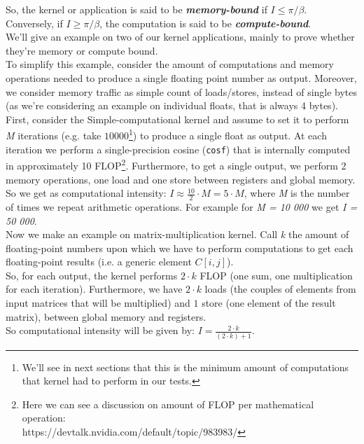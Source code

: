 	So, the kernel or application is said to be \textit{\textbf{memory-bound}} if \(I \leq \pi /\beta \).\\
	Conversely, if \( I\geq \pi /\beta \), the computation is said to be \textit{\textbf{compute-bound}}\cite{rooflinepaper, applyroofline}.\\
	We'll give an example on two of our kernel applications, mainly to prove whether they're memory or compute bound.\\
	To simplify this example, consider the amount of computations and memory operations needed to produce a single floating point number as output.
	Moreover, we consider memory traffic as simple count of loads/stores, instead of single bytes (as we're considering an example on individual floats, that is always 4 bytes).\\
	First, consider the Simple-computational kernel and assume to set it to perform \textit{M} iterations (e.g. take \(10000\)\footnote{We'll see in next sections that this is the minimum amount of computations that kernel had to perform in our tests.}) to produce a single float as output. At each iteration we perform a single-precision cosine (\texttt{cosf}) that is internally computed in approximately 10 FLOP\footnote{Here we can see a discussion on amount of FLOP per mathematical operation:\\ https://devtalk.nvidia.com/default/topic/983983/}. Furthermore, to get a single output, we perform 2 memory operations, one load and one store between registers and global memory.\\
	So we get as computational intensity: \(I \approx \frac{10}{2} \cdot M = 5 \cdot M \), where \textit{M} is the number of times we repeat arithmetic operations. For example for \textit{M = 10 000} we get \textit{I = 50 000}.\\
	
	Now we make an example on matrix-multiplication kernel.
	Call \textit{k} the amount of floating-point numbers upon which we have to perform computations to get each floating-point results (i.e. a generic element \(C[i, j]\)).\\
	So, for each output, the kernel performs \(2 \cdot k\) FLOP (one sum, one multiplication for each iteration).
	Furthermore, we have \(2 \cdot k\) loads (the couples of elements from input matrices that will be multiplied) and \(1\) store (one element of the result matrix), between global memory and registers.\\
	So computational intensity will be given by: \(I = \frac{2 \cdot k}{(2 \cdot k) + 1} \).\\
	
